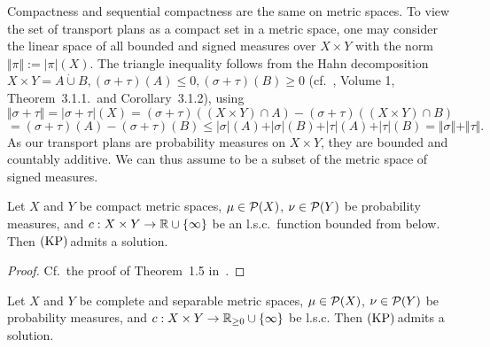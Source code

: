 \begin{remark}
	Compactness and sequential compactness are the same on metric spaces. To view the set of transport plans as a compact set in a metric space, one may consider the linear space of all bounded and signed measures over $X \times Y$ with the norm $\Vert \pi \Vert := |\pi|(X)$. The triangle inequality follows from the Hahn decomposition $X \times Y = A \dot{\cup} B, (\sigma + \tau)(A) \le 0, (\sigma + \tau)(B) \ge 0$ (cf.~\cite{Bog2007}, Volume 1, Theorem~3.1.1.~and Corollary~3.1.2), using
	\[ \Vert \sigma + \tau \Vert = \vert \sigma + \tau \vert (X) = (\sigma + \tau)((X \times Y) \cap A) - (\sigma + \tau)((X \times Y) \cap B) \]
	\[ = (\sigma + \tau)(A) - (\sigma + \tau)(B) \le \vert \sigma \vert (A) + \vert \sigma \vert (B) + \vert \tau \vert (A) + \vert \tau \vert (B) = \Vert \sigma \Vert + \Vert \tau \Vert. \]
	As our transport plans are probability measures on $X \times Y$, they are bounded and countably additive. We can thus assume \TP{\mu}{\nu} to be a subset of the metric space of signed measures.
\end{remark}

\begin{lemma}\label{KPAdmitCompLSCBound}
	Let $X$ and $Y$ be compact metric spaces, $\mu \in \PM{X}$, $\nu \in \PM{Y}$ be probability measures, and $\map[c]{X \times Y}{\R \cup \{ \infty \}}$ be an l.s.c.\ function bounded from below. Then$\text{\normalfont\ (KP)\,}$admits a solution.
\end{lemma}

\begin{proof}
	Cf.~the proof of Theorem~1.5 in~\cite{San2015}.
\end{proof}

\begin{theorem}\label{KPAdmitPolishLSC}
	Let $X$ and $Y$ be complete and separable metric spaces, $\mu \in \PM{X}$, $\nu \in \PM{Y}$ be probability measures, and $\map[c]{X \times Y}{\RZero \cup \{ \infty \}}$ be l.s.c. Then$\text{\normalfont\ (KP)\,}$admits a solution.
\end{theorem}

